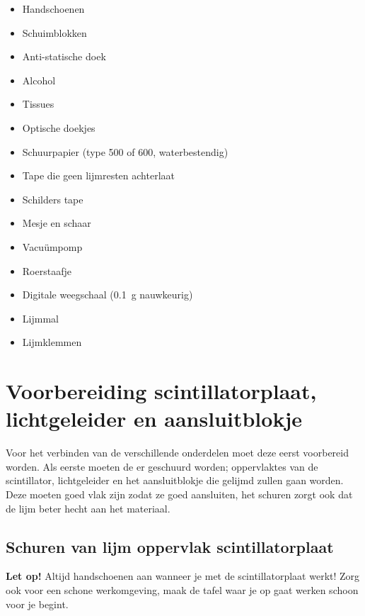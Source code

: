 \begin{itemize}
    \item Handschoenen
    \item Schuimblokken
    \item Anti-statische doek
    \item Alcohol
    \item Tissues
    \item Optische doekjes
    \item Schuurpapier (type 500 of 600, waterbestendig)
    \item Tape die geen lijmresten achterlaat
    \item Schilders tape
    \item Mesje en schaar
    \item Vacuümpomp
    \item Roerstaafje
    \item Digitale weegschaal (\SI{0.1}{\gram} nauwkeurig)
    \item Lijmmal
    \item Lijmklemmen
\end{itemize}


\section{Voorbereiding scintillatorplaat, lichtgeleider en aansluitblokje}

Voor het verbinden van de verschillende onderdelen moet deze eerst
voorbereid worden. Als eerste moeten de er geschuurd worden;
oppervlaktes van de scintillator, lichtgeleider en het aansluitblokje
die gelijmd zullen gaan worden. Deze moeten goed vlak zijn zodat ze goed
aansluiten, het schuren zorgt ook dat de lijm beter hecht aan het
materiaal.


\subsection{Schuren van lijm oppervlak scintillatorplaat}

\textbf{Let op!} Altijd handschoenen aan wanneer je met de
scintillatorplaat werkt! Zorg ook voor een schone werkomgeving, maak de
tafel waar je op gaat werken schoon voor je begint.

